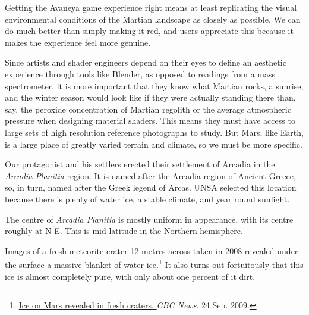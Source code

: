 


    {}
Getting the Avaneya game experience right means at least replicating the visual environmental conditions of the Martian landscape as closely as possible. We can do much better than simply making it red, and users appreciate this because it makes the experience feel more genuine.

Since artists and shader engineers depend on their eyes to define an aesthetic experience through tools like Blender, as opposed to readings from a mass spectrometer, it is more important that they know what Martian rocks, a sunrise, and the winter season would look like if they were actually standing there than, say, the peroxide concentration of Martian regolith or the average atmospheric pressure when designing material shaders. This means they must have access to large sets of high resolution reference photographs to study. But Mars, like Earth, is a large place of greatly varied terrain and climate, so we must be more specific.

Our protagonist  and his settlers erected their settlement of Arcadia in the {\it Arcadia Planitia} region. It is named after the Arcadia region of Ancient Greece, so, in turn, named after the Greek legend of Arcas. UNSA selected this location because there is plenty of water ice, a stable climate, and year round sunlight.

The centre of {\it Arcadia Planitia} is mostly uniform in appearance, with its centre roughly at N E. This is mid-latitude in the Northern hemisphere. 

Images of a fresh meteorite crater 12 metres across taken in 2008 revealed under the surface a massive blanket of water ice.\footnote{\href{http://www.cbc.ca/news/technology/story/2009/09/24/tech-space-water-mars-crater.html}{Ice on Mars revealed in fresh craters. }{\it CBC News}. 24 Sep. 2009.} It also turns out fortuitously that this ice is almost completely pure, with only about one percent of it dirt.

